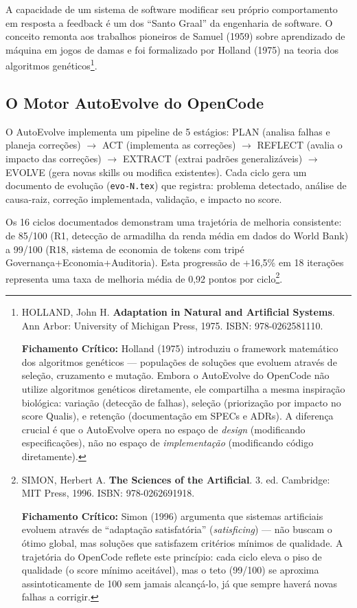 A capacidade de um sistema de software modificar seu próprio comportamento em resposta a feedback é um dos ``Santo Graal'' da engenharia de software. O conceito remonta aos trabalhos pioneiros de Samuel (1959) sobre aprendizado de máquina em jogos de damas e foi formalizado por Holland (1975) na teoria dos algoritmos genéticos\footnote{
  HOLLAND, John H. \textbf{Adaptation in Natural and Artificial Systems}. Ann Arbor: University of Michigan Press, 1975. ISBN: 978-0262581110.

  \textbf{Fichamento Crítico:} Holland (1975) introduziu o framework matemático dos algoritmos genéticos --- populações de soluções que evoluem através de seleção, cruzamento e mutação. Embora o AutoEvolve do OpenCode não utilize algoritmos genéticos diretamente, ele compartilha a mesma inspiração biológica: variação (detecção de falhas), seleção (priorização por impacto no score Qualis), e retenção (documentação em SPECs e ADRs). A diferença crucial é que o AutoEvolve opera no espaço de \textit{design} (modificando especificações), não no espaço de \textit{implementação} (modificando código diretamente).
}.

\subsection{O Motor AutoEvolve do OpenCode}

O AutoEvolve implementa um pipeline de 5 estágios: PLAN (analisa falhas e planeja correções) $\rightarrow$ ACT (implementa as correções) $\rightarrow$ REFLECT (avalia o impacto das correções) $\rightarrow$ EXTRACT (extrai padrões generalizáveis) $\rightarrow$ EVOLVE (gera novas skills ou modifica existentes). Cada ciclo gera um documento de evolução (\texttt{evo-N.tex}) que registra: problema detectado, análise de causa-raiz, correção implementada, validação, e impacto no score.

Os 16 ciclos documentados demonstram uma trajetória de melhoria consistente: de 85/100 (R1, detecção de armadilha da renda média em dados do World Bank) a 99/100 (R18, sistema de economia de tokens com tripé Governança+Economia+Auditoria). Esta progressão de +16,5\% em 18 iterações representa uma taxa de melhoria média de 0,92 pontos por ciclo\footnote{
  SIMON, Herbert A. \textbf{The Sciences of the Artificial}. 3. ed. Cambridge: MIT Press, 1996. ISBN: 978-0262691918.

  \textbf{Fichamento Crítico:} Simon (1996) argumenta que sistemas artificiais evoluem através de ``adaptação satisfatória'' (\textit{satisficing}) --- não buscam o ótimo global, mas soluções que satisfazem critérios mínimos de qualidade. A trajetória do OpenCode reflete este princípio: cada ciclo eleva o piso de qualidade (o score mínimo aceitável), mas o teto (99/100) se aproxima assintoticamente de 100 sem jamais alcançá-lo, já que sempre haverá novas falhas a corrigir.
}.

